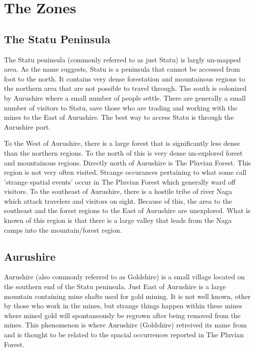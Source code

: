 \chapter{The Zones}

\section{The Statu Peninsula}

The Statu peninsula (commonly referred to as just Statu) is largly un-mapped area. As the name suggests, Statu is a peninsula that cannot be accessed from foot to the north. It contains very dense forestation and mountainous regions to the northern area that are not possible to travel through. The south is colonized by Aurushire where a small number of people settle. There are generally a small number of visitors to Statu, save those who are trading and working with the mines to the East of Aurushire. The best way to access Statu is through the Aurushire port.

To the West of Aurushire, there is a large forest that is significantly less dense than the northern regions. To the north of this is very dense un-explored forest and mountainous regions. Directly north of Aurushire is The Pluvian Forest. This region is not very often visited. Strange occurances pertaining to what some call 'strange spatial events' occur in The Pluvian Forest which generally ward off visitors. To the southeast of Aurushire, there is a hostile tribe of river Naga which attack travelers and visitors on sight. Because of this, the area to the southeast and the forest regions to the East of Aurushire are unexplored. What is known of this region is that there is a large valley that leads from the Naga camps into the mountain/forest region.

\section{Aurushire}

Aurushire (also commonly referred to as Goldshire) is a small village located on the southern end of the Statu peninsula. Just East of Aurushire is a large mountain containing mine shafts used for gold mining. It is not well known, other by those who work in the mines, but strange things happen within these mines where mined gold will spontaneously be regrown after being removed from the mines. This phenomenon is where Aurushire (Goldshire) retreived its name from and is thought to be related to the spacial occurrences reported in The Pluvian Forest. 

